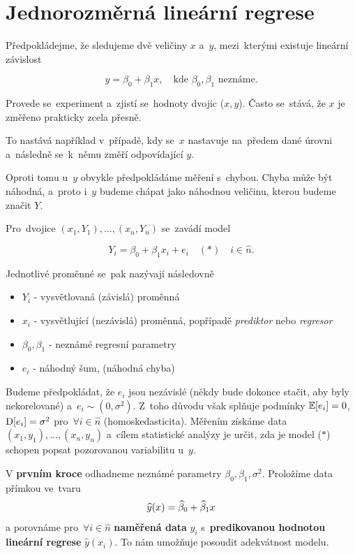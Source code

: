 \chapter{Jednorozměrná lineární regrese}
Předpokládejme, že sledujeme dvě veličiny $x$ a~$y$, mezi~kterými existuje lineární závislost

 $$
	y = \beta_0 + \beta_1 x,\quad \text{kde } \beta_0, \beta_1 \text{ neznáme.}
 $$

Provede se~experiment a~zjistí se~hodnoty dvojic ($x, y$). Často se~stává, že $x$ je změřeno prakticky zcela přesně.

\begin{remark}
 To nastává například v~případě, kdy se~$x$ nastavuje na~předem dané úrovni a~následně se~k~němu změří odpovídající $y$.
\end{remark}

Oproti tomu u~$y$ obvykle předpokládáme měření s~chybou. Chyba může být náhodná, a~proto i~$y$ budeme chápat jako náhodnou veličinu, kterou budeme značit $Y$.

Pro~dvojice $(x_1, Y_1),...,(x_n, Y_n)$ se~zavádí model

 $$
	Y_i = \beta_0 + \beta_1 x_i + e_i \quad (*) \quad i\in\widehat{n}.
 $$

Jednotlivé proměnné se~pak nazývají následovně

\begin{itemize}
  \item $Y_i$ - vysvětlovaná (závislá) proměnná
  \item $x_i$ - vysvětlující (nezávislá) proměnná, popřípadě \textit{prediktor} nebo \textit{regresor}
  \item $\beta_0,\beta_1$ - neznámé regresní parametry
  \item $e_i$ - náhodný šum, (náhodná chyba)
\end{itemize}

Budeme předpokládat, že $e_i$ jsou nezávislé (někdy bude dokonce stačit, aby byly nekorelované) a~$e_i \sim (0,\sigma^2)$. Z~toho důvodu však splňuje podmínky $\mathbb{E} [e_i] = 0$, $\mathrm{D} [e_i] = \sigma^2$ pro~$\forall i\in\widehat{n}$ (homoskedasticita). Měřením získáme data $(x_1, y_1),...,(x_n, y_n)$ a~cílem statistické analýzy je určit, zda je model ($*$) schopen popsat pozorovanou variabilitu u~$y$.

V \textbf{prvním kroce} odhadneme neznámé parametry $\beta_0, \beta_1, \sigma^2$. Proložíme data přímkou ve~tvaru
 $$
	\widehat{y}(x) = \widehat{\beta}_0 + \widehat{\beta}_1 x
 $$
a porovnáme pro~$\forall i\in\widehat{n}$ \textbf{naměřená data} $y_i$ s~\textbf{predikovanou hodnotou lineární regrese} $\widehat{y}(x_i)$. To nám umožňuje posoudit adekvátnost modelu.

